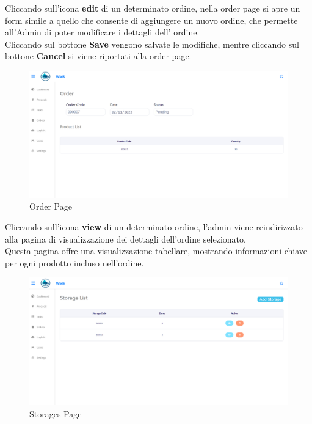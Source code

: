 Cliccando sull'icona \textbf{edit} di un determinato ordine, nella order page si apre un form simile a quello che
consente di aggiungere un nuovo ordine, che permette all'Admin di poter modificare i dettagli dell' ordine.\\
Cliccando sul bottone \textbf{Save} vengono salvate le modifiche, mentre cliccando sul bottone \textbf{Cancel} si viene
riportati alla order page.

\begin{figure}[H]
    \centering
    \includegraphics[width=\textwidth]{document/sections/img/Storyboard/viewOrder.png}
    \caption{Order Page}
    \label{fig:viewOrdersPage}
\end{figure}

Cliccando sull'icona \textbf{view} di un determinato ordine, l’admin viene
reindirizzato alla pagina di visualizzazione dei dettagli dell'ordine selezionato.\\
Questa pagina offre una visualizzazione tabellare, mostrando informazioni chiave per ogni prodotto
incluso nell'ordine.

\begin{figure}[H]
    \centering
    \includegraphics[width=\textwidth]{document/sections/img/Storyboard/storagePage.png}
    \caption{Storages Page}
    \label{fig:storagesPage}
\end{figure}

